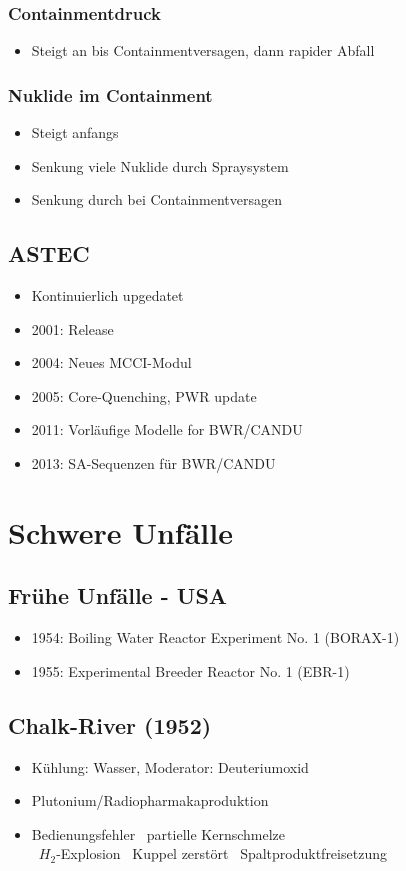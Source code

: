 \documentclass[12pt]{article}
\begin{document}
\subsubsection{Containmentdruck}
\begin{itemize}
	\item Steigt an bis Containmentversagen, dann rapider Abfall
\end{itemize}

\subsubsection{Nuklide im Containment}
\begin{itemize}
	\item Steigt anfangs
	\item Senkung viele Nuklide durch Spraysystem
	\item Senkung durch bei Containmentversagen
\end{itemize}

\subsection{ASTEC}
\begin{itemize}
	\item Kontinuierlich upgedatet
	\item 2001: Release
	\item 2004: Neues MCCI-Modul
	\item 2005: Core-Quenching, PWR update
	\item 2011: Vorläufige Modelle for BWR/CANDU
	\item 2013: SA-Sequenzen für BWR/CANDU
\end{itemize}

\section{Schwere Unfälle}

\subsection{Frühe Unfälle - USA}
\begin{itemize}
	\item 1954: Boiling Water Reactor Experiment No. 1 (BORAX-1)
	\item 1955: Experimental Breeder Reactor No. 1 (EBR-1)
\end{itemize}

\subsection{Chalk-River (1952)}
\begin{itemize}
	\item Kühlung: Wasser, Moderator: Deuteriumoxid
	\item Plutonium/Radiopharmakaproduktion
	\item Bedienungsfehler \textrightarrow\ partielle Kernschmelze\\
		\textrightarrow\ \(H_2\)-Explosion \textrightarrow\ Kuppel zerstört \textrightarrow\ Spaltproduktfreisetzung
\end{itemize}
\end{document}
